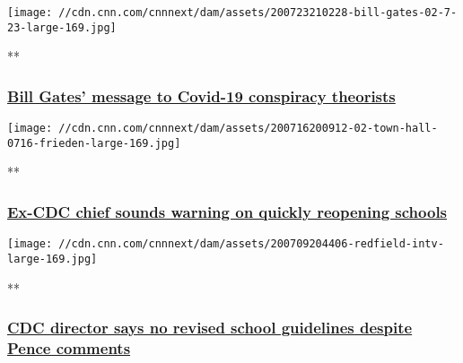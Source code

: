 \href{/videos/business/2020/07/24/bill-gates-conspiracy-theories-coronavirus-covid-19-social-media-town-hall-vpx.cnnbusiness/video/playlists/cnn-coronavirus-town-hall/}{}

\texttt{[image: //cdn.cnn.com/cnnnext/dam/assets/200723210228-bill-gates-02-7-23-large-169.jpg]}

**

\hypertarget{bill-gates-message-to-covid-19-conspiracy-theorists}{%
\subsubsection{\texorpdfstring{\href{/videos/business/2020/07/24/bill-gates-conspiracy-theories-coronavirus-covid-19-social-media-town-hall-vpx.cnnbusiness/video/playlists/cnn-coronavirus-town-hall/}{Bill
Gates' message to Covid-19 conspiracy
theorists}}{Bill Gates' message to Covid-19 conspiracy theorists}}\label{bill-gates-message-to-covid-19-conspiracy-theorists}}

\href{/videos/health/2020/07/17/tom-frieden-reopening-schools-coronoavirus-sot-town-hall-vpx.cnn/video/playlists/cnn-coronavirus-town-hall/}{}

\texttt{[image: //cdn.cnn.com/cnnnext/dam/assets/200716200912-02-town-hall-0716-frieden-large-169.jpg]}

**

\hypertarget{ex-cdc-chief-sounds-warning-on-quickly-reopening-schools}{%
\subsubsection{\texorpdfstring{\href{/videos/health/2020/07/17/tom-frieden-reopening-schools-coronoavirus-sot-town-hall-vpx.cnn/video/playlists/cnn-coronavirus-town-hall/}{Ex-CDC
chief sounds warning on quickly reopening
schools}}{Ex-CDC chief sounds warning on quickly reopening schools}}\label{ex-cdc-chief-sounds-warning-on-quickly-reopening-schools}}

\href{/videos/politics/2020/07/10/mike-pence-cdc-robert-redfield-guidelines-coronavirus-town-hall-sot-vpx.cnn/video/playlists/cnn-coronavirus-town-hall/}{}

\texttt{[image: //cdn.cnn.com/cnnnext/dam/assets/200709204406-redfield-intv-large-169.jpg]}

**

\hypertarget{cdc-director-says-no-revised-school-guidelines-despite-pence-comments}{%
\subsubsection{\texorpdfstring{\href{/videos/politics/2020/07/10/mike-pence-cdc-robert-redfield-guidelines-coronavirus-town-hall-sot-vpx.cnn/video/playlists/cnn-coronavirus-town-hall/}{CDC
director says no revised school guidelines despite Pence
comments}}{CDC director says no revised school guidelines despite Pence comments}}\label{cdc-director-says-no-revised-school-guidelines-despite-pence-comments}}

